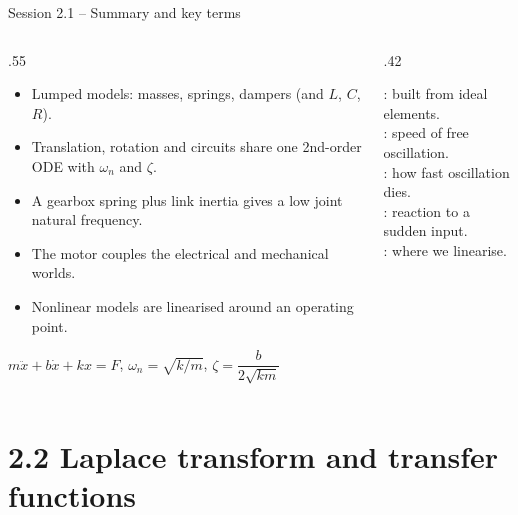 \documentclass[aspectratio=169,10pt]{beamer}
\begin{document}
\begin{frame}{Session 2.1 -- Summary and key terms}
\begin{columns}[T]
\begin{column}{.55\textwidth}
\small
\begin{itemize}
\item Lumped models: masses, springs, dampers (and $L$, $C$, $R$).
\item Translation, rotation and circuits share one 2nd-order ODE with $\omega_n$ and $\zeta$.
\item A gearbox spring plus link inertia gives a low joint natural frequency.
\item The motor couples the electrical and mechanical worlds.
\item Nonlinear models are linearised around an operating point.
\end{itemize}
\begin{keybox}[Remember]
$m\ddot x+b\dot x+kx=F$, \quad $\omega_n=\sqrt{k/m}$, \quad $\zeta=\dfrac{b}{2\sqrt{km}}$
\end{keybox}
\end{column}
\begin{column}{.42\textwidth}
\begin{defbox}
\small
{}: built from ideal elements.\\
: speed of free oscillation.\\
: how fast oscillation dies.\\
: reaction to a sudden input.\\
: where we linearise.
\end{defbox}
\end{column}
\end{columns}
\end{frame}

\section{2.2 Laplace transform and transfer functions}
\end{document}
